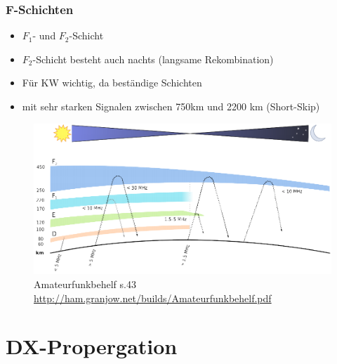 \begin{frame}
    \frametitle{F-Schichten}
    \begin{itemize}
        \item $F_1$- und $F_2$-Schicht
        \item $F_2$-Schicht besteht auch nachts (langsame Rekombination)
        \item Für KW wichtig, da beständige Schichten
        \item mit sehr starken Signalen zwischen 750km und 2200 km (Short-Skip)
    \end{itemize}
	\begin{center}
          \begin{figure}
            \includegraphics[width=.8\textwidth,height=.4\textheight,keepaspectratio]{e09/schichten_behelf_43.png}
              \caption{Amateurfunkbehelf s.43 \ExternalLink \url{http://ham.granjow.net/builds/Amateurfunkbehelf.pdf}}
          \end{figure}
    \end{center}
\end{frame}

\section*{DX-Propergation}

